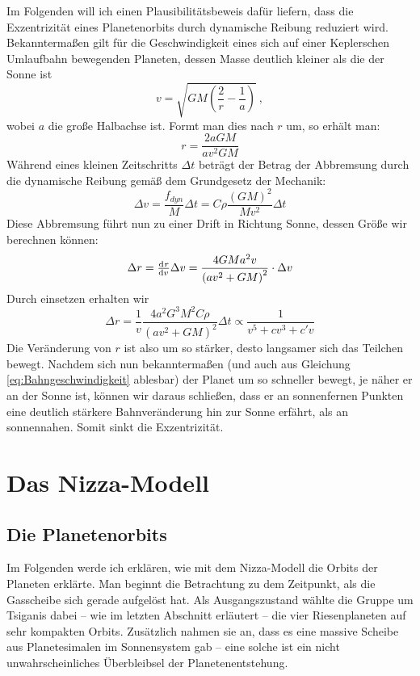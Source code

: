 \documentclass[12pt,a4paper,twoside,open=right,bibliography=totoc]{scrbook}
\renewcommand{\cite}{ \citep}
\begin{document}
Im Folgenden will ich einen Plausibilitätsbeweis dafür liefern, dass die Exzentrizität eines Planetenorbits durch dynamische Reibung reduziert wird.
Bekanntermaßen gilt für die Geschwindigkeit eines sich auf einer Keplerschen Umlaufbahn bewegenden Planeten, dessen Masse deutlich kleiner als die der Sonne ist
\begin{equation}\label{eq:Bahngeschwindigkeit}
v= \sqrt{GM\left(\frac{2}{r}-\frac{1}{a}\right)} \:,
\end{equation}
wobei $a$ die große Halbachse ist. Formt man dies nach $r$ um, so erhält man:
\begin{equation}
r = \frac{2aGM}{av^2GM}
\end{equation}
Während eines kleinen Zeitschritts $\Delta t$ beträgt der Betrag der Abbremsung durch die dynamische Reibung gemäß dem Grundgesetz der Mechanik:
\begin{equation}
\Delta v = \frac{f_{dyn}}{M} \Delta t = C \rho \frac{\left(GM\right)^2}{Mv^2} \Delta t
\end{equation}
Diese Abbremsung führt nun zu einer Drift in Richtung Sonne, dessen Größe wir berechnen können:
\begin{equation}
\Delta r = \od{r}{v}\Delta v = \frac{4GMa^2v}{\left(av^2+GM\right)^2} \cdot \Delta v
\end{equation}
Durch einsetzen erhalten wir
\begin{equation}
\Delta r = \frac{1}{v} \frac{4a^2G^3M^2 C \rho}{\left(av^2+GM\right)^2}  \Delta t \propto \frac{1}{v^5+cv^3+c'v}
\end{equation}
Die Veränderung von $r$ ist also um so stärker, desto langsamer sich das Teilchen bewegt. Nachdem sich nun bekanntermaßen (und auch aus Gleichung \ref{eq:Bahngeschwindigkeit} ablesbar) der Planet um so schneller bewegt, je näher er an der Sonne ist, können wir daraus schließen, dass er an sonnenfernen Punkten eine deutlich stärkere Bahnveränderung hin zur Sonne erfährt, als an sonnennahen. Somit sinkt die Exzentrizität.


\chapter{Das Nizza-Modell}
\section{Die Planetenorbits}\label{Orbits}
Im Folgenden werde ich erklären, wie \cite{Tsiganis2005} mit dem Nizza-Modell die Orbits der Planeten erklärte.
Man beginnt die Betrachtung zu dem Zeitpunkt, als die Gasscheibe sich gerade aufgelöst hat.
Als Ausgangszustand wählte die Gruppe um Tsiganis dabei – wie im letzten Abschnitt erläutert – die vier Riesenplaneten auf sehr kompakten Orbits. Zusätzlich nahmen sie an, dass es eine massive Scheibe aus Planetesimalen im Sonnensystem gab -- eine solche ist ein nicht unwahrscheinliches Überbleibsel der Planetenentstehung.
\end{document}
